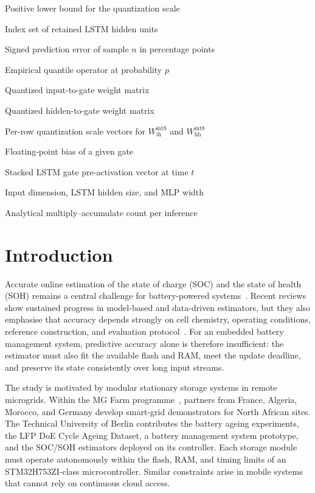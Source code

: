 \documentclass[final,3p,times]{elsarticle}
\begin{document}
\begin{description}[style=multiline,leftmargin=1.5cm,font=\bfseries]
\item[$\varepsilon_q$] Positive lower bound for the quantization scale
\item[$\mathcal{R}$] Index set of retained LSTM hidden units
\item[$e_n$] Signed prediction error of sample $n$ in percentage points
\item[$Q_p(\cdot)$] Empirical quantile operator at probability $p$
\item[$W_{\mathrm{ih}}^{\mathrm{int8}}$] Quantized input-to-gate weight matrix
\item[$W_{\mathrm{hh}}^{\mathrm{int8}}$] Quantized hidden-to-gate weight matrix
\item[$s_{\mathrm{ih}}, s_{\mathrm{hh}}$] Per-row quantization scale vectors for $W_{\mathrm{ih}}^{\mathrm{int8}}$ and $W_{\mathrm{hh}}^{\mathrm{int8}}$
\item[$b_{\mathrm{fp32}}$] Floating-point bias of a given gate
\item[$\mathbf{a}_t$] Stacked LSTM gate pre-activation vector at time $t$
\item[$D,H,M$] Input dimension, LSTM hidden size, and MLP width
\item[$N_{\mathrm{MAC}}$] Analytical multiply--accumulate count per inference
\end{description}
\normalsize
\section{Introduction}
Accurate online estimation of the state of charge (SOC) and the state of health (SOH) remains a central challenge for battery-powered systems~\cite{yaoSmarterBatteryManagement2025a,a.m.s.m.h.s.attanayakaEstimationStateCharge2019,berecibarCriticalReviewState2016,shrivastavaReviewTechnologicalAdvancement2023}. Recent reviews show sustained progress in model-based and data-driven estimators, but they also emphasise that accuracy depends strongly on cell chemistry, operating conditions, reference construction, and evaluation protocol~\cite{guoSystematicReviewElectrochemical2024,yaoSmarterBatteryManagement2025a}. For an embedded battery management system, predictive accuracy alone is therefore insufficient: the estimator must also fit the available flash and RAM, meet the update deadline, and preserve its state consistently over long input streams.

The study is motivated by modular stationary storage systems in remote microgrids. Within the MG Farm programme~\cite{leap-reMGFARMSmart,microenergyMGFARMPoweringSustainable,aqachtoulMGFARMIoTEdgeDriven2026,technischeuniversitatberlinMGFarmSmart}, partners from France, Algeria, Morocco, and Germany develop smart-grid demonstrators for North African sites. The Technical University of Berlin contributes the battery ageing experiments, the LFP DoE Cycle Ageing Dataset, a battery management system prototype, and the SOC/SOH estimators deployed on its controller. Each storage module must operate autonomously within the flash, RAM, and timing limits of an STM32H753ZI-class microcontroller. Similar constraints arise in mobile systems that cannot rely on continuous cloud access.
\end{document}
